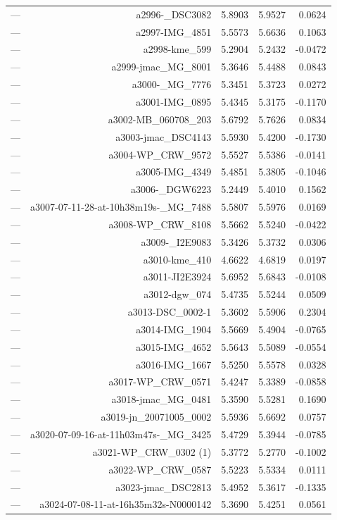 \begin{table}[htbp]
\begin{tabular}{lrrrr}
— & a2996-_DSC3082 & 5.8903 & 5.9527 & 0.0624 \\
— & a2997-IMG_4851 & 5.5573 & 5.6636 & 0.1063 \\
— & a2998-kme_599 & 5.2904 & 5.2432 & -0.0472 \\
— & a2999-jmac_MG_8001 & 5.3646 & 5.4488 & 0.0843 \\
— & a3000-_MG_7776 & 5.3451 & 5.3723 & 0.0272 \\
— & a3001-IMG_0895 & 5.4345 & 5.3175 & -0.1170 \\
— & a3002-MB_060708_203 & 5.6792 & 5.7626 & 0.0834 \\
— & a3003-jmac_DSC4143 & 5.5930 & 5.4200 & -0.1730 \\
— & a3004-WP_CRW_9572 & 5.5527 & 5.5386 & -0.0141 \\
— & a3005-IMG_4349 & 5.4851 & 5.3805 & -0.1046 \\
— & a3006-_DGW6223 & 5.2449 & 5.4010 & 0.1562 \\
— & a3007-07-11-28-at-10h38m19s-_MG_7488 & 5.5807 & 5.5976 & 0.0169 \\
— & a3008-WP_CRW_8108 & 5.5662 & 5.5240 & -0.0422 \\
— & a3009-_I2E9083 & 5.3426 & 5.3732 & 0.0306 \\
— & a3010-kme_410 & 4.6622 & 4.6819 & 0.0197 \\
— & a3011-JI2E3924 & 5.6952 & 5.6843 & -0.0108 \\
— & a3012-dgw_074 & 5.4735 & 5.5244 & 0.0509 \\
— & a3013-DSC_0002-1 & 5.3602 & 5.5906 & 0.2304 \\
— & a3014-IMG_1904 & 5.5669 & 5.4904 & -0.0765 \\
— & a3015-IMG_4652 & 5.5643 & 5.5089 & -0.0554 \\
— & a3016-IMG_1667 & 5.5250 & 5.5578 & 0.0328 \\
— & a3017-WP_CRW_0571 & 5.4247 & 5.3389 & -0.0858 \\
— & a3018-jmac_MG_0481 & 5.3590 & 5.5281 & 0.1690 \\
— & a3019-jn_20071005_0002 & 5.5936 & 5.6692 & 0.0757 \\
— & a3020-07-09-16-at-11h03m47s-_MG_3425 & 5.4729 & 5.3944 & -0.0785 \\
— & a3021-WP_CRW_0302 (1) & 5.3772 & 5.2770 & -0.1002 \\
— & a3022-WP_CRW_0587 & 5.5223 & 5.5334 & 0.0111 \\
— & a3023-jmac_DSC2813 & 5.4952 & 5.3617 & -0.1335 \\
— & a3024-07-08-11-at-16h35m32s-N0000142 & 5.3690 & 5.4251 & 0.0561 \\

\end{tabular}
\end{table}
